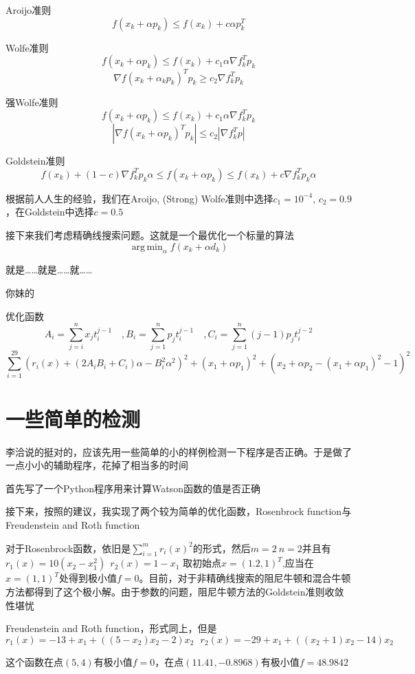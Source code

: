 \documentclass[a4paper, 11pt]{article}
\begin{document}
Aroijo准则
\[f(x_k+\alpha p_k)\le f(x_k)+c\alpha p_k^T\]

Wolfe准则
\[f(x_k+\alpha p_k)\le f(x_k)+c_1\alpha\nabla f_k^Tp_k\]
\[\nabla f(x_k+\alpha_kp_k)^Tp_k \ge c_2\nabla f_k^Tp_k\]

强Wolfe准则
\[f(x_k+\alpha p_k)\le f(x_k)+c_1\alpha\nabla f_k^Tp_k\]
\[|\nabla f(x_k+\alpha p_k)^Tp_k| \le c_2|\nabla f_k^Tp|\]

Goldstein准则
\[f(x_k)+(1-c)\nabla f_k^Tp_k\alpha \le f(x_k+\alpha p_k)\le f(x_k)+c\nabla f_k^T p_k\alpha\]

根据前人人生的经验，我们在Aroijo, (Strong) Wolfe准则中选择$c_1=10^{-4},\,c_2=0.9$，在Goldstein中选择$c=0.5$

接下来我们考虑精确线搜索问题。这就是一个最优化一个标量的算法
\[\mathop{\arg\,\min}_\alpha f(x_k+\alpha d_k)\]

就是……就是……就……

你妹的

优化函数
\[
A_i=\sum_{j=i}^{n}x_jt_i^{j-1}\quad, B_i=\sum_{j=1}^np_jt_i^{j-1}\quad, C_i=\sum_{j=1}^n(j-1)p_jt_i^{j-2}
\]
\[
\sum_{i=1}^{29}\left(r_i(x)+\left(2A_iB_i+C_i\right)\alpha -B_i^2\alpha^2\right)^2+(x_1+\alpha p_1)^2+(x_2+\alpha p_2-(x_1+\alpha p_1)^2-1)^2
\]

\section{一些简单的检测}

李洽说的挺对的，应该先用一些简单的小的样例检测一下程序是否正确。于是做了一点小小的辅助程序，花掉了相当多的时间

首先写了一个Python程序用来计算Watson函数的值是否正确

接下来，按照\cite{More:1981:TUO:355934.355936}的建议，我实现了两个较为简单的优化函数，Rosenbrock function\cite{doi:10.1093/comjnl/3.3.175}与Freudenstein and Roth function\cite{Freudenstein:1963:NSS:321186.321200}

对于Rosenbrock函数，依旧是$\sum_{i=1}^{m}r_i(x)^2$的形式，然后$m=2~n=2$并且有$r_1(x)=10(x_2-x_1^2)~~r_2(x)=1-x_1$
取初始点$x=(1.2, 1)^T$,应当在$x=(1,1)^T$处得到极小值$f=0$。目前，对于非精确线搜索的阻尼牛顿和混合牛顿方法都得到了这个极小解。由于参数的问题，阻尼牛顿方法的Goldstein准则收敛性堪忧

Freudenstein and Roth function，形式同上，但是
\[r_1(x)=-13+x_1+((5-x_2)x_2-2)x_2~~~r_2(x)=-29+x_1+((x_2+1)x_2-14)x_2\]

这个函数在点$(5,4)$有极小值$f=0$，在点$(11.41, -0.8968)$有极小值$f=48.9842$
\end{document}
